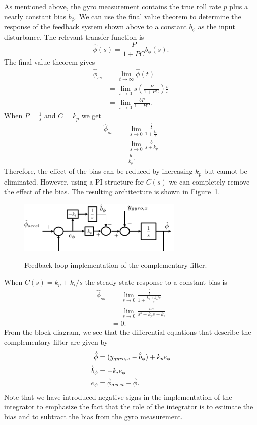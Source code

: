 As mentioned above, the gyro measurement contains the true roll rate $p$ plus a nearly constant bias $b_\phi$.  We can use the final value theorem to determine the response of the feedback system shown above to a constant $b_\phi$ as the input disturbance.  The relevant transfer function is
$$
\hat{\phi}(s) = \frac{P}{1+PC} b_\phi(s).
$$
The final value theorem gives
\begin{align*}
\hat{\phi}_{ss} &= \lim_{t\to\infty} \hat{\phi}(t) \\
                &= \lim_{s\to 0} s\left(\frac{P}{1+PC}\right)\frac{b}{s} \\
                &= \lim_{s\to 0} \frac{bP}{1+PC}.
\end{align*}
When $P=\frac{1}{s}$ and $C=k_p$ we get
\begin{align*}
\hat{\phi}_{ss} &= \lim_{s\to 0} \frac{\frac{b}{s}}{1+\frac{k_p}{s}} \\
                &= \lim_{s\to 0} \frac{b}{s+k_p} \\
                &= \frac{b}{k_p}.
\end{align*}
Therefore, the effect of the bias can be reduced by increasing $k_p$ but cannot be eliminated.  However, using a PI structure for $C(s)$ we can completely remove the effect of the bias.  The resulting architecture is shown in Figure~\ref{fig:complementary_filter_roll}.
\begin{figure}[hhhhtb]
  \centering
  \includegraphics[width=0.7\textwidth]{chap11_attitude_estimation/figures/complementary_filter_roll}\\
  \caption{Feedback loop implementation of the complementary filter.}%
  \label{fig:complementary_filter_roll}
\end{figure}
When $C(s) = k_p + k_i/s$ the steady state response to a constant bias is 
\begin{align*}
\hat{\phi}_{ss} &= \lim_{s\to 0} \frac{\frac{b}{s}}{1+\frac{k_p+k_i/s}{s}} \\
                &= \lim_{s\to 0} \frac{bs}{s^s+k_p s + k_i} \\
                &= 0.
\end{align*}
From the block diagram, we see that the differential equations that describe the complementary filter are given by
\begin{align}
\dot{\hat{\phi}} &= (y_{gyro,x}-\hat{b}_\phi) + k_p e_\phi \notag \\
\dot{\hat{b}}_\phi &= -k_ie_\phi \label{eq:complementary_filter_phi} \\
e_\phi &= \hat{\phi}_{accel}-\hat{\phi}. \notag
\end{align}
Note that we have introduced negative signs in the implementation of the integrator to emphasize the fact that the role of the integrator is to estimate the bias and to subtract the bias from the gyro measurement.  

